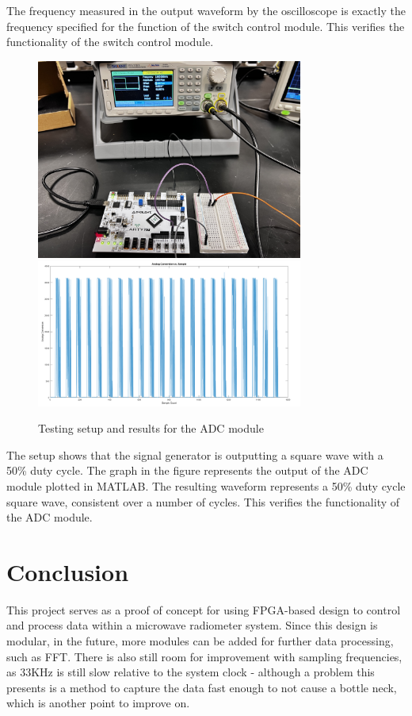 \documentclass[titlepage]{article}
\begin{document}
\noindent
The frequency measured in the output waveform by the oscilloscope is exactly the frequency specified for the function of the switch control module. This verifies the functionality of the switch control module.

\newpage

\begin{figure}[h]
    \includegraphics[width=0.78\textwidth]{assets/adctest.jpg}
    \includegraphics[width=0.78\textwidth]{assets/adcfigure.png}
    \centering
    \caption{Testing setup and results for the ADC module}
\end{figure}
\label{figure4}

\noindent
The setup shows that the signal generator is outputting a square wave with a 50\% duty cycle. The graph in the figure represents the output of the ADC module plotted in MATLAB. The resulting waveform represents a 50\% duty cycle square wave, consistent over a number of cycles. This verifies the functionality of the ADC module.


\newpage

\section{Conclusion}
\label{conclusion}
This project serves as a proof of concept for using FPGA-based design to control and process data within a microwave radiometer system. Since this design is modular, in the future, more modules can be added for further data processing, such as FFT. There is also still room for improvement with sampling frequencies, as 33KHz is still slow relative to the system clock - although a problem this presents is a method to capture the data fast enough to not cause a bottle neck, which is another point to improve on.
\end{document}
